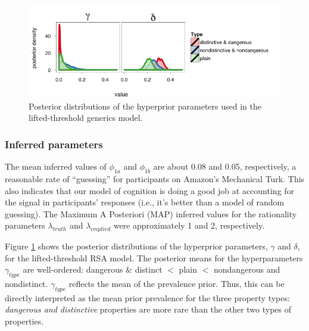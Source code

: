 \documentclass[10pt,letterpaper]{article}
\begin{document}


\begin{figure}
\centering
    \includegraphics[width=\columnwidth]{lvRSA_hyperparams_sidebyside}
  \caption{Posterior distributions of the hyperprior parameters used in the lifted-threshold generics model.}
   \label{fig:posthyper}
\end{figure}

\subsubsection{Inferred parameters}
The mean inferred values of  $\phi_{1a}$ and $\phi_{1b}$ are about 0.08 and 0.05, respectively, a reasonable rate of ``guessing'' for participants on Amazon's Mechanical Turk. This also  indicates that our model of cognition is doing a good job at accounting for the signal in participants' responses (i.e., it's better than a model of random guessing). The Maximum A Posteriori (MAP) inferred values for the rationality parameters $\lambda_{truth}$ and $\lambda_{implied}$ were approximately 1 and 2, respectively. 


Figure \ref{fig:posthyper} shows the posterior distributions of the hyperprior parameters, $\gamma$ and $\delta$, for the lifted-threshold RSA model. The posterior means for the hyperparameters $\gamma_{type}$ are well-ordered: dangerous \& distinct $<$ plain $<$ nondangerous and nondistinct. $\gamma_{type}$ reflects the mean of the prevalence prior. Thus, this can be directly interpreted as the mean prior prevalence for the three property types: \emph{dangerous and distinctive} properties are more rare than the other two types of properties. 
\end{document}
